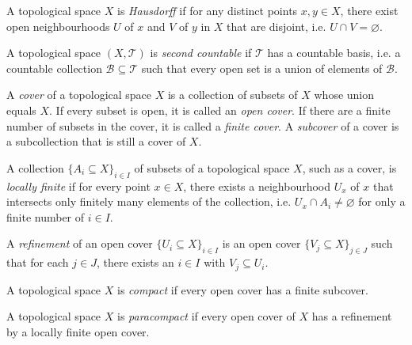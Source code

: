 \documentclass[a4paper,12pt]{article}
\begin{document}
\begin{appendices}
\begin{definition}[Hausdorff]\label{def:hausdorff}
    A topological space $X$ is \emph{Hausdorff} if for any distinct points $x, y \in X$, there exist open neighbourhoods $U$ of $x$ and $V$ of $y$ in $X$ that are disjoint, i.e. $U \cap V = \varnothing$.
\end{definition}
\begin{definition}\label{def:second_countable}
    A topological space $(X, \mathcal{T})$ is \emph{second countable} if $\mathcal{T}$ has a countable basis, i.e. a countable collection $\mathcal{B} \subseteq \mathcal{T}$ such that every open set is a union of elements of $\mathcal{B}$.
\end{definition}
\begin{definition}[Cover]\label{def:cover}
    A \emph{cover} of a topological space $X$ is a collection of subsets of $X$ whose union equals $X$.
    If every subset is open, it is called an \emph{open cover}.
    If there are a finite number of subsets in the cover, it is called a \emph{finite cover}.
    A \emph{subcover} of a cover is a subcollection that is still a cover of $X$.
\end{definition}
\begin{definition}\label{def:locally_finite_cover}
    A collection $\{A_i \subseteq X\}_{i \in I}$ of subsets of a topological space $X$, such as a cover, is \emph{locally finite} if for every point $x \in X$, there exists a neighbourhood $U_x$ of $x$ that intersects only finitely many elements of the collection, i.e. $U_x \cap A_i \neq \varnothing$ for only a finite number of $i \in I$.
\end{definition}
\begin{definition}\label{def:refinement_of_open_covers}
    A \emph{refinement} of an open cover $\{U_i \subseteq X\}_{i \in I}$ is an open cover $\{V_j \subseteq X\}_{j \in J}$ such that for each $j \in J$, there exists an $i \in I$ with $V_j \subseteq U_i$.
\end{definition}
\begin{definition}[Compact]\label{def:compact}
    A topological space $X$ is \emph{compact} if every open cover has a finite subcover.
\end{definition}
\begin{definition}[Paracompact]\label{def:paracompact}
    A topological space $X$ is \emph{paracompact} if every open cover of $X$ has a refinement by a locally finite open cover.
\end{definition}

\end{appendices}
\end{document}
